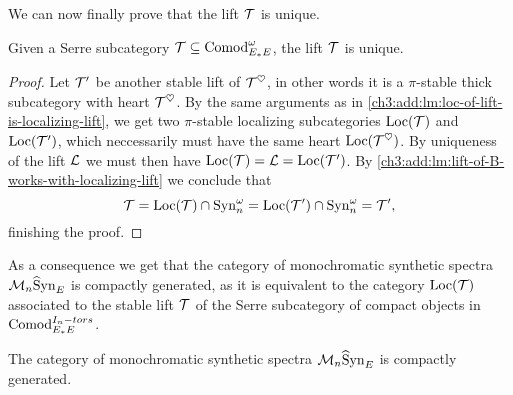 We can now finally prove that the lift $\mathcal{T}$ is unique. 

\begin{theorem}
    \label{ch3:add:thm:uniqueness-of-lift}
    Given a Serre subcategory $\mathcal{T}\subseteq \mathrm{Comod}_{E_*E}^\omega$, the lift $\mathcal{T}$ is unique. 
\end{theorem}
\begin{proof}
    Let $\mathcal{T}'$ be another stable lift of $\mathcal{T}^\heartsuit$, in other words it is a $\pi$-stable thick subcategory with heart $\mathcal{T}^\heartsuit$. By the same arguments as in \cref{ch3:add:lm:loc-of-lift-is-localizing-lift}, we get two $\pi$-stable localizing subcategories $\operatorname{Loc}(\mathcal{T})$ and $\operatorname{Loc}(\mathcal{T}')$, which neccessarily must have the same heart $\operatorname{Loc}(\mathcal{T}^\heartsuit)$. By uniqueness of the lift $\mathcal{L}$ we must then have $\operatorname{Loc}(\mathcal{T}) = \mathcal{L} = \operatorname{Loc}(\mathcal{T}')$. By \cref{ch3:add:lm:lift-of-B-works-with-localizing-lift} we conclude that 
    \[\mathcal{T} = \operatorname{Loc}(\mathcal{T})\cap \mathrm{Syn}_{n}^\omega = \operatorname{Loc}(\mathcal{T}')\cap \mathrm{Syn}_{n}^\omega = \mathcal{T}',\]
    finishing the proof. 
\end{proof}

As a consequence we get that the category of monochromatic synthetic spectra $\mathcal{M}_{n}\widehat{\mathrm{S}}\mathrm{yn}_{E}$ is compactly generated, as it is equivalent to the category $\operatorname{Loc}(\mathcal{T})$ associated to the stable lift $\mathcal{T}$ of the Serre subcategory of compact objects in $\mathrm{Comod}_{E_*E}^{I_n-tors}$. 

\begin{corollary}
    The category of monochromatic synthetic spectra $\mathcal{M}_{n}\widehat{\mathrm{S}}\mathrm{yn}_{E}$ is compactly generated. 
\end{corollary}




